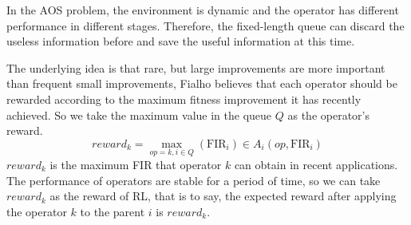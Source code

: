 \documentclass[journal]{IEEEtran}
\begin{document}
In the AOS problem, the environment is dynamic and the operator has different performance in different stages. Therefore, the fixed-length queue can discard the useless information before and save the useful information at this time.

The underlying idea is that rare, but large improvements are more important than frequent small improvements, Fialho \cite{fialho2010comparison} believes that each operator should be rewarded according to the maximum fitness improvement it has recently achieved.
So we take the maximum value in the queue $Q$ as the operator's reward.
\begin{equation}
  reward_k = \max_{op=k, i\in Q}(\text{FIR}_i) \in A_i(op,\text{FIR}_i)
\end{equation}
$reward_k$ is the maximum FIR that operator $k$ can obtain in recent applications.
The performance of operators are stable for a period of time, so we can take $reward_k$ as the reward of RL, that is to say, the expected reward after applying the operator $k$ to the parent $i$ is $reward_k$.
\end{document}
